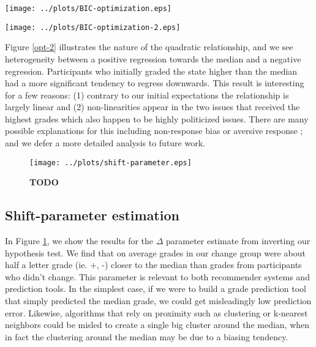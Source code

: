 \begin{figure*}[h!]
  \centering
    \texttt{[image: ../plots/BIC-optimization.eps]}
      \caption{\textbf{TODO}}
      \label{opt-1}
\end{figure*}

\begin{figure*}[h!]
  \centering
    \texttt{[image: ../plots/BIC-optimization-2.eps]}
      \caption{\textbf{TODO}}
      \label{opt-2}
\end{figure*}

Figure \ref{opt-2} illustrates the nature of the quadratic relationship, and we see heterogeneity between a positive regression towards the median and a negative regression.
Participants who initially graded the state higher than the median had a more significant tendency to regress downwards.
This result is interesting for a few reasons: (1) contrary to our initial expectations the relationship is largely linear and (2) non-linearities appear in the two issues that received the highest grades which also happen to be highly politicized issues.
There are many possible explanations for this including non-response bias \cite{???} or aversive response \cite{???}; and we defer a more detailed analysis to future work.

\begin{figure}[ht!]
  \centering
    \texttt{[image: ../plots/shift-parameter.eps]}
      \caption{\textbf{TODO}}
      \label{dev-1}
\end{figure}

\subsection{Shift-parameter estimation}
In Figure \ref{dev-1}, we show the results for the $\Delta$ parameter estimate from inverting our hypothesis test.
We find that on average grades in our change group were about half a letter grade (ie. +, -) closer to the median than grades from participants who didn't change.
This parameter is relevant to both recommender systems and prediction tools.
In the simplest case, if we were to build a grade prediction tool that simply predicted the median grade, we could get misleadingly low prediction error.  
Likewise, algorithms that rely on proximity such as clustering or k-nearest neighbors could be misled to create a single big cluster around the median, when in fact the clustering around the median may be due to a biasing tendency.

